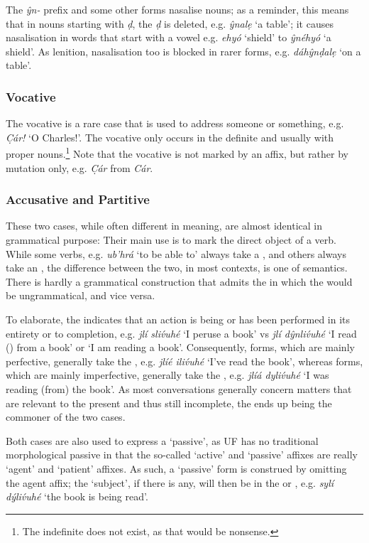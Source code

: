 \documentclass[a4paper, 12pt, twoside, final]{article}
\let \w \textit
\begin{document}
The  \w{ŷn-} prefix and some other forms nasalise nouns; as a reminder, this means that in
nouns starting with \w{ḍ}, the \w{ḍ} is deleted, e.g. \w{ŷnalẹ} ‘a table’; it causes nasalisation in words
that start with a vowel e.g. \w{ehyó} ‘shield’ to \w{ŷnéhyó} ‘a shield’. As lenition, nasalisation too is
blocked in rarer forms, e.g.  \w{dáhŷnḍalẹ} ‘on a table’.

\subsubsection{Vocative}
The vocative is a rare case that is used to address someone or something, e.g. \w{C̣ár!} ‘O Charles!’. The vocative
only occurs in the definite and usually with proper nouns.\footnote{The indefinite 
does not exist, as that would be nonsense.} Note that the vocative is not marked by an affix, but
rather by mutation only, e.g. \w{C̣ár} from \w{Cár}.

\subsubsection{Accusative and Partitive}
These two cases, while often different in meaning, are almost identical in grammatical purpose: Their main use is to
mark the direct object of a verb. While some verbs, e.g. \w{ub’hrá} ‘to be
able to’ always take a , and others always take an , the difference between the two, in most contexts,
is one of semantics. There is hardly a grammatical construction that admits the  in which the  would be
ungrammatical, and vice versa.

To elaborate, the  indicates that an action is being or has been performed in its entirety or to completion, e.g.
\w{jlí sliv́uhé} ‘I peruse a book’ vs \w{jlí dŷnliv́uhé} ‘I read () from a book’ or ‘I am reading a book’. Consequently,
 forms, which are mainly perfective, generally take the , e.g. \w{jlíé iliv́uhé} ‘I’ve read the book’,
whereas  forms, which are mainly imperfective, generally take the , e.g. \w{jlíá dyliv́uhé} ‘I was reading
(from) the book’. As most conversations generally concern matters that are relevant to the present and thus still incomplete,
the  ends up being the commoner of the two cases.

Both cases are also used to express a ‘passive’, as UF has no traditional morphological passive in that the so-called
‘active’ and ‘passive’ affixes are really ‘agent’ and ‘patient’ affixes. As such, a ‘passive’ form is construed by
omitting the agent affix; the ‘subject’, if there is any, will then be in the  or , e.g. \w{sylí dýliv́uhé}
‘the book is being read’.
\end{document}

